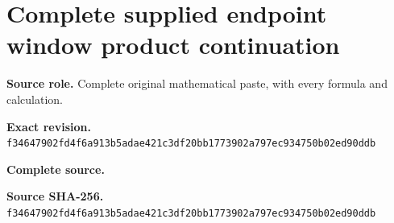 \begingroup
\sloppy
\small
\clearpage
\section{Complete supplied endpoint window product continuation}
\noindent\textbf{Source role.} Complete original mathematical paste, with every formula and calculation.\par
\noindent\textbf{Exact revision.} \nolinkurl{f34647902fd4f6a913b5adae421c3df20bb1773902a797ec934750b02ed90ddb}\par
\noindent\textbf{Complete source.} \par
\noindent\textbf{Source SHA-256.} \nolinkurl{f34647902fd4f6a913b5adae421c3df20bb1773902a797ec934750b02ed90ddb}\par\medskip

\endgroup
